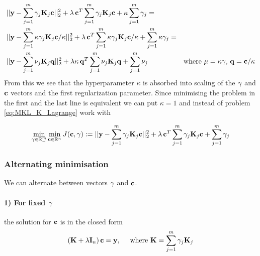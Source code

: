 \begin{eqnarray*}
& ||\mathbf{y} - \sum_{j=1}^m \gamma_j \mathbf{K}_j \mathbf{c}||_2^2 +
\lambda \, \mathbf{c}^T \sum_{j=1}^m \gamma_j \mathbf{K}_j \mathbf{c} + \kappa \sum_{j=1}^m \gamma_j = & \nonumber \\
& ||\mathbf{y} - \sum_{j=1}^m \kappa \gamma_j \mathbf{K}_j \mathbf{c}/\kappa ||_2^2 +
\lambda \, \mathbf{c}^T \sum_{j=1}^m \kappa \gamma_j \mathbf{K}_j \mathbf{c}/\kappa + \sum_{j=1}^m \kappa \gamma_j = & \nonumber \\
& ||\mathbf{y} - \sum_{j=1}^m \nu_j \mathbf{K}_j \mathbf{q} ||_2^2 +
\lambda \kappa \, \mathbf{q}^T \sum_{j=1}^m \nu_j \mathbf{K}_j \mathbf{q} + \sum_{j=1}^m \nu_j & \text{where } \mathbf{\mu} = \kappa \mathbf{\gamma}, \, \mathbf{q} = \mathbf{c}/\kappa 
\end{eqnarray*}
From this we see that the hyperparameter $\kappa$ is absorbed into scaling of the $\mathbf{\gamma}$ and $\mathbf{c}$ vectors and the first regularization parameter.
Since  minimising the problem in the first and the last line is equivalent we can put $\kappa = 1$ and instead of problem \eqref{eq:MKL_K_Lagrange} work with

\begin{equation}\label{eq:MKL_K2}
\min_{\gamma \in \mathbb{R}^m_+} \min_{\mathbf{c} \in \mathbb{R}^n} J(\mathbf{c},\mathbf{\gamma}):= ||\mathbf{y} - \sum_{j=1}^m \gamma_j \mathbf{K}_j \mathbf{c}||_2^2 +
\lambda \, \mathbf{c}^T \sum_{j=1}^m \gamma_j \mathbf{K}_j \mathbf{c} + \sum_{j=1}^m \gamma_j
\end{equation}

\subsubsection{Alternating minimisation}
We can alternate between vectors $\mathbf{\gamma}$ and $\mathbf{c}$.

\paragraph{1) For fixed $\mathbf{\gamma}$} the solution for $\mathbf{c}$ is in the closed form 
\begin{equation}\label{eq:MKLAltC}
(\mathbf{K} + \lambda \mathbf{I}_n) \, \mathbf{c} = \mathbf{y}, \quad \text{ where } \mathbf{K} = \sum_{j=1}^m \gamma_j \mathbf{K}_j
\end{equation}

